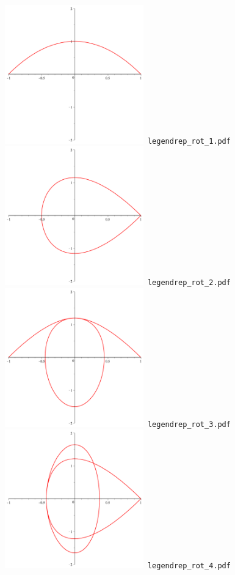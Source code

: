 \documentclass[a4paper]{amsart}
\begin{document}
\includegraphics[width=6cm]{legendrep_rot_1.pdf}\verb+ legendrep_rot_1.pdf+\\
\includegraphics[width=6cm]{legendrep_rot_2.pdf}\verb+ legendrep_rot_2.pdf+\\
\includegraphics[width=6cm]{legendrep_rot_3.pdf}\verb+ legendrep_rot_3.pdf+\\
\includegraphics[width=6cm]{legendrep_rot_4.pdf}\verb+ legendrep_rot_4.pdf+\\
\end{document}
